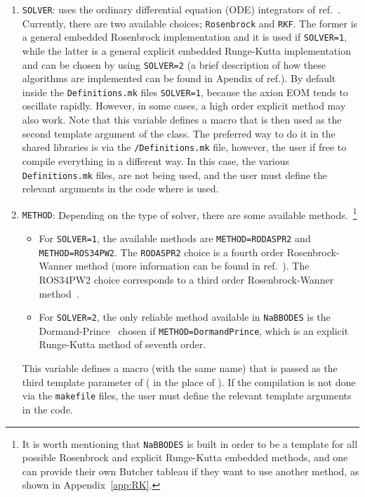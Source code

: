 \documentclass[11pt,a4paper]{article}
\begin{document}
\begin{enumerate}
	\item {\tt SOLVER}: \nsc uses the ordinary differential equation (ODE) integrators of ref.~\cite{NaBBODES}. Currently, there are two available choices; {\tt Rosenbrock} and {\tt RKF}. The former is a general embedded Rosenbrock implementation and it is used if {\tt SOLVER=1}, while the latter is a general explicit embedded Runge-Kutta implementation and can be chosen by using {\tt SOLVER=2} (a brief description of how these algorithms are implemented can be found in Apendix of ref.\cite{Karamitros:2021nxi}). By default inside the {\tt Definitions.mk} files {\tt SOLVER=1}, because the axion EOM tends to oscillate rapidly. However, in some cases, a high order explicit method may also work. Note that this variable defines a macro that is then used as the second template argument of the  class. The preferred way to do it in the shared libraries is via the {\tt \nsc/Definitions.mk} file, however, the user if free to compile everything in a different way. In this case, the  various {\tt Definitions.mk} files, are not being used, and the user must define the relevant arguments in the code where \nsc is used.
	\item {\tt METHOD}: Depending on the type of solver, there are some available methods.~\footnote{It is worth mentioning that {\tt NaBBODES} is built in order to be a template for all possible Rosenbrock and explicit Runge-Kutta embedded methods, and one can provide their own Butcher tableau if they want to use another method, as shown in Appendix~\ref{app:RK}.}  
	\begin{itemize}
		\item 	For {\tt SOLVER=1}, the available methods are 
		{\tt METHOD=RODASPR2} and {\tt METHOD=ROS34PW2}. The {\tt RODASPR2} choice is a fourth order Rosenbrock-Wanner method (more information can be found in ref.~\cite{RANG2015128}). The {ROS34PW2} choice corresponds to a third order Rosenbrock-Wanner method~\cite{RangAngermann2005}. 
		\item 	For {\tt SOLVER=2}, the only reliable method available in {\tt NaBBODES} is the Dormand-Prince~\cite{DORMAND198019} chosen if {\tt METHOD=DormandPrince}, which is an explicit Runge-Kutta method of seventh order.
	\end{itemize}
	This variable defines a macro (with the same name) that is passed as the third template parameter of  (\ie {} in the place of ). 
	If the compilation is not done via the {\tt makefile} files, the user must define the relevant template arguments in the code.

\end{enumerate}
\end{document}
